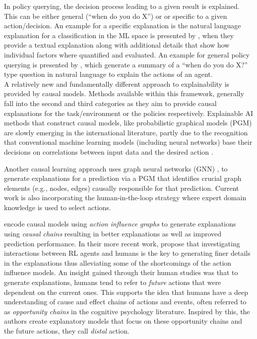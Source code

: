 \documentclass[twoside,11pt]{article}
\begin{document}

In policy querying, the decision process leading to a given result is explained. This can be either general (``when do you do X'') or or specific to a given action/decision.
An example for a specific explanation is the natural language explanation for a classification in the ML space is presented by \citet{AlonsoEtAl:2018:xAINLBeerClassifier}, when they provide a textual explanation along with additional details that show how individual factors where quantified and evaluated. An example for general policy querying is presented by \citet{HayesShah:2017:AutonomousPolicyExplanation}, which generate a summary of a ``when do you do X?'' type question in natural language to explain the actions of an agent. \\



A relatively new and fundamentally different approach to explainability is provided by causal models. Methods available within this framework, generally fall into the second and third categories as they aim to provide causal explanations for the task/environment or the policies respectively. Explainable AI methods that construct causal models, like probabilistic graphical models (PGM) \citep{Koller:2009:ProbabilisticGraphicalModelsBook, Saranti:2019:LearningCompetencePGMs} are slowly emerging in the international literature, 
partly due to the recognition that conventional machine learning models (including neural networks) base their decisions on correlations between input data and the desired action  \citep{Lapuschkin:2019:UnmaskingCleverHans}. 

Another causal learning approach uses graph neural networks (GNN) \citep{Vu:2020:PGMExplainer}, to generate explanations for a prediction via a PGM that identifies crucial graph elements (e.g., nodes, edges) causally responsible for that prediction. Current work is also incorporating the human-in-the-loop strategy \citep{HolzingerEtAl:2016:iMLExperiment, Holzinger:2019:HumanLoopAPIN} where expert domain knowledge is used to select actions. 

\citet{MadumalEtAl:2020:CausalRLCFs} encode causal models using \emph{action influence graphs} to generate explanations using \emph{causal chains} resulting in better explanations as well as improved prediction performance. In their more recent work, \citet{Madumal:2020:DistalEF} propose that investigating interactions between RL agents and humans is the key to generating finer details in the explanations thus alleviating some of the shortcomings of the action influence models. An insight gained through their human studies was that to generate explanations, humans tend to refer to \emph{future} actions that were dependent on the current ones. This supports the idea that humans have a deep understanding of cause and effect chains of actions and events, often referred to as \emph{opportunity chains} in the cognitive psychology literature. Inspired by this, the authors create explanatory models that focus on these opportunity chains and the future actions, they call \emph{distal} action. 
\end{document}
